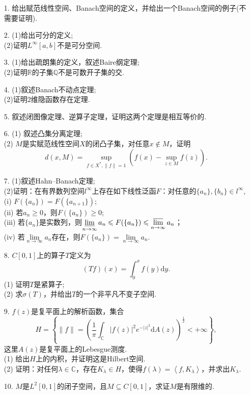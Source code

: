 \begin{enumerate}
    \item[1.]给出赋范线性空间、Banach空间的定义，并给出一个Banach空间的例子(不需要证明).

    \item[2.](1)给出可分的定义;\\
    (2)证明$L^\infty[a,b]$不是可分空间.

    \item[3.](1)给出疏朗集的定义，叙述Baire纲定理;\\
    (2)证明$\mathbb{R}$的子集$\mathbb{Q}$不是可数开子集的交.

    \item[4.](1)叙述Banach不动点定理;\\
    (2)证明$2$维隐函数存在定理.

    \item[5.]叙述闭图像定理、逆算子定理，证明这两个定理是相互等价的.

    \item[6.](1) 叙述凸集分离定理;\\
    (2) $M$是实赋范线性空间$X$的闭凸子集，对任意$x\notin M$，证明
    \[d(x,M)=\sup_{f\in X^*,\|f\|=1}\left( f(x)-\sup_{z\in M}f(z) \right).\]

    \item[7.](1)叙述Hahn--Banach定理;\\
    (2)证明：在有界数列空间$l^\infty$上存在如下线性泛函$F$：对任意的$\{a_n\},\{b_n\}\in l^\infty$,\\
    \quad (i) $F(\{a_n\})=F(\{a_{n+1}\})$;\\
    \quad (ii) 若$a_n\geqslant 0$，则$F(\{a_n\})\geqslant 0$;\\
    \quad (iii) 若$\{a_n\}$是实数列，则$\varliminf\limits_{n\to \infty}a_n\leqslant F(\{a_n\})\leqslant \varlimsup\limits_{n\to \infty} a_n$；\\
    \quad (iv) 若$\lim\limits_{n\to \infty} a_n$存在，则$F(\{a_n\})=\lim\limits_{n\to \infty} a_n$.

    \item[8.] $C[0,1]$上的算子$T$定义为
    \[ (Tf)(x)=\int_{0}^x f(y)\mathrm{d}y.\]
    \quad (1) 证明$T$是紧算子;\\
    \quad (2) 求$\sigma(T)$，并给出$T$的一个非平凡不变子空间.

    \item[9.] $f(z)$是复平面上的解析函数，集合
    \[H=\left\{\|f\|= \left(\frac{1}{\pi}\int_{\mathbb{C}} |f(z)|^2 e^{-|z|^2} \mathrm{d}A(z)\right)^{\frac{1}{2}}<+\infty\right\},\]
    这里$A(z)$是复平面上的Lebesgue测度.\\
    \quad (1) 给出$H$上的内积，并证明这是Hilbert空间.\\
    \quad (2) 证明：对任何$\lambda\in \mathbb{C}$，存在$K_\lambda\in H$，使得$f(\lambda)=\left< f,K_\lambda\right>$，并求出$K_\lambda$.\\
    [上传者注：$H$称为Fock空间，答案是$K_\lambda(z)=e^{z\bar{\lambda}}$，
    其研究见朱克和的专著\textit{Analysis on Fock Spaces}, GTM 263, 2012.]

    \item[10.] $M$是$L^2[0,1]$的闭子空间，且$M\subseteq C[0,1]$，求证$M$是有限维的.
\end{enumerate}

